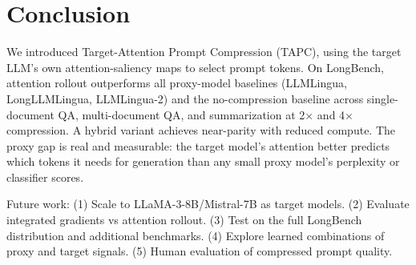 \documentclass[11pt,letterpaper]{article}
\begin{document}
\section{Conclusion}
We introduced Target-Attention Prompt Compression (TAPC), using the target LLM's own attention-saliency maps to select prompt tokens. On LongBench, attention rollout outperforms all proxy-model baselines (LLMLingua, LongLLMLingua, LLMLingua-2) and the no-compression baseline across single-document QA, multi-document QA, and summarization at 2$\times$ and 4$\times$ compression. A hybrid variant achieves near-parity with reduced compute. The proxy gap is real and measurable: the target model's attention better predicts which tokens it needs for generation than any small proxy model's perplexity or classifier scores.

Future work: (1) Scale to LLaMA-3-8B/Mistral-7B as target models. (2) Evaluate integrated gradients vs attention rollout. (3) Test on the full LongBench distribution and additional benchmarks. (4) Explore learned combinations of proxy and target signals. (5) Human evaluation of compressed prompt quality.



\end{document}
